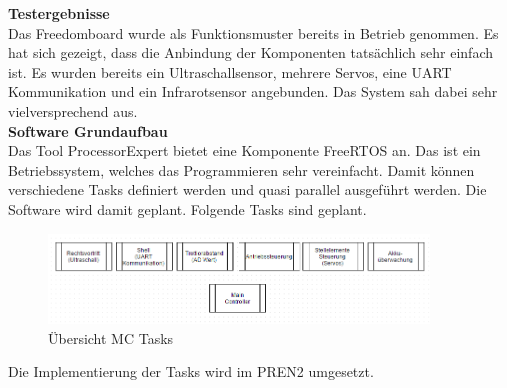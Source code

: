 \textbf{Testergebnisse}\\[0.2cm]
Das Freedomboard wurde als Funktionsmuster bereits in Betrieb genommen. Es hat sich gezeigt, dass die Anbindung der Komponenten tatsächlich sehr einfach ist. Es wurden bereits ein Ultraschallsensor, mehrere Servos, eine UART Kommunikation und ein Infrarotsensor angebunden. Das System sah dabei sehr vielversprechend aus.\\[0.2cm]
\textbf{Software Grundaufbau}\\[0.2cm]
Das Tool ProcessorExpert bietet eine Komponente FreeRTOS an. Das ist ein Betriebssystem, welches das Programmieren sehr vereinfacht. Damit können verschiedene Tasks definiert werden und quasi parallel ausgeführt werden. Die Software wird damit geplant. Folgende Tasks sind geplant.
\begin{figure}[h]
	\centering
	\includegraphics[width=0.9\textwidth]{03_Loesungskonzept/pictures/MC_Tasks.png}
	\caption{Übersicht MC Tasks}
\end{figure}\flushleft
Die Implementierung der Tasks wird im PREN2 umgesetzt.